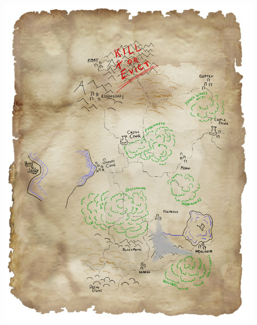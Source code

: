 \cleartoleftpage            %
\begin{samepage}
\null
\thispagestyle{empty}
\vfill
\noindent
\includegraphics[width=0.999\textwidth]{./map/region-eviction-pl.jpg}
\vfill
\end{samepage}


